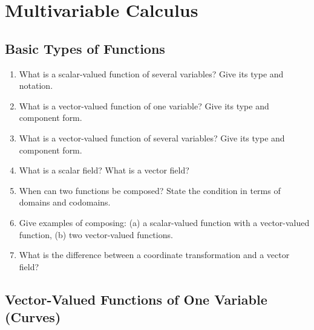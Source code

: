 \section{Multivariable Calculus}

\subsection{Basic Types of Functions}

\begin{enumerate}

\item What is a scalar-valued function of several variables? Give its type and notation.

\item What is a vector-valued function of one variable? Give its type and component form.

\item What is a vector-valued function of several variables? Give its type and component form.

\item What is a scalar field? What is a vector field?

\item When can two functions be composed? State the condition in terms of domains and codomains.

\item Give examples of composing:
(a) a scalar-valued function with a vector-valued function,
(b) two vector-valued functions.

\item What is the difference between a coordinate transformation and a vector field?

\end{enumerate}

\subsection{Vector-Valued Functions of One Variable (Curves)}

